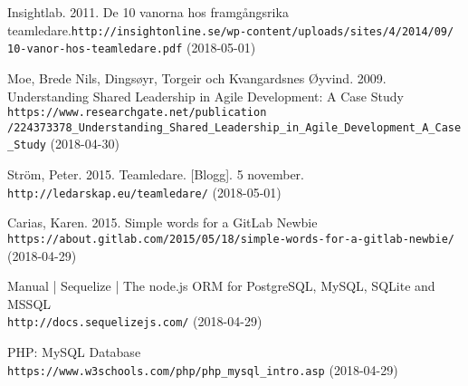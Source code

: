 \begin{thebibliography}{99}

Insightlab. 2011. De 10 vanorna hos framgångsrika teamledare.\texttt{http://insightonline.se/wp-content/uploads/sites/4/2014/09/
10-vanor-hos-teamledare.pdf}
(2018-05-01)

Moe, Brede Nils, Dingsøyr, Torgeir och Kvangardsnes Øyvind. 2009. Understanding Shared Leadership in Agile Development: A Case Study
\texttt{https://www.researchgate.net/publication
/224373378_Understanding_Shared_Leadership_in_Agile_Development_A_Case_Study}
(2018-04-30)

 Ström, Peter. 2015. Teamledare. [Blogg]. 5 november. \texttt{http://ledarskap.eu/teamledare/} 
(2018-05-01)

Carias, Karen. 2015. Simple words for a GitLab Newbie
\\\texttt{https://about.gitlab.com/2015/05/18/simple-words-for-a-gitlab-newbie/}
(2018-04-29)

Manual | Sequelize | The node.js ORM for PostgreSQL, MySQL, SQLite and MSSQL \\\texttt{http://docs.sequelizejs.com/}
(2018-04-29)

PHP: MySQL Database \\\texttt{https://www.w3schools.com/php/php_mysql_intro.asp} 
(2018-04-29)

\end{thebibliography}